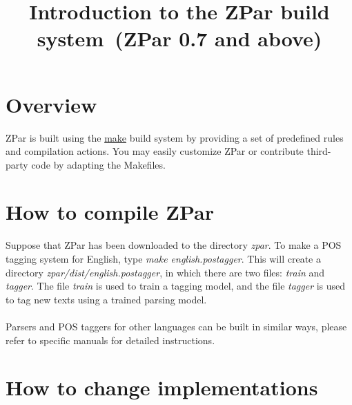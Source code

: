 \documentclass[12pt]{article}
\title{Introduction to the ZPar build system~(ZPar 0.7 and above)}
\begin{document}
\begin{CJK}{GBK}{song}
\maketitle

\section{Overview}
\label{sec:overview}
ZPar is built using the \href{http://www.gnu.org/software/make/}{make} build system
by providing a set of predefined rules and compilation actions.
You may easily customize ZPar or contribute third-party code
by adapting the Makefiles.

\section{How to compile ZPar}
Suppose that ZPar has been downloaded to the directory \textit{zpar}. 
To make a POS tagging system for English, 
type \textit{make english.postagger}. 
This will create a directory \textit{zpar/dist/english.postagger}, 
in which there are two files: \textit{train} and \textit{tagger}. 
The file \textit{train} is used to train a tagging model,
and the file \textit{tagger} is used to tag new texts using a trained parsing model.
\\
\\
Parsers and POS taggers for other languages can be built in similar ways,
please refer to specific manuals for detailed instructions.

\section{How to change implementations}
\label{sec:how-change-impl}


\end{CJK}
\end{document}
